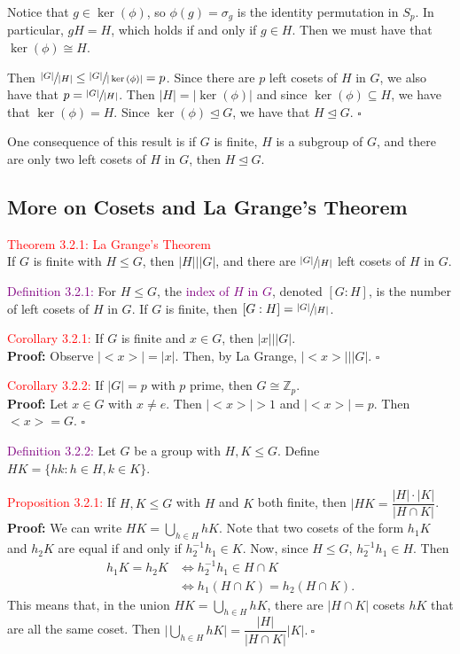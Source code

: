 \documentclass{article}
\begin{document}
Notice that $g \in \ker{(\phi)}$, so $\phi(g)=\sigma_g$ is the identity permutation in $S_p$. In particular, $gH=H$, which holds if and 
only if $g \in H$. Then we must have that $\ker(\phi) \cong H$.

Then $\sfrac{|G|}{|H|} \leq \sfrac{|G|}{|\ker{(\phi)}|} = p$. Since there are $p$ left cosets of $H$ in $G$, we also have that 
$p = \sfrac{|G|}{|H|}$. Then $|H| = |\ker{(\phi)}|$ and since $\ker{(\phi)} \subseteq H$, we have that $\ker{(\phi)}=H$. Since 
$\ker{(\phi)} \trianglelefteq G$, we have that $H \trianglelefteq G$. $\square$

One consequence of this result is if $G$ is finite, $H$ is a subgroup of $G$, and there are only two left cosets of $H$ in $G$, then 
$H \trianglelefteq G$.


\subsection{More on Cosets and La Grange's Theorem}

\textcolor{red}{Theorem 3.2.1: La Grange's Theorem}\\
If $G$ is finite with $H \leq G$, then $|H| \big| |G|$, and there are $\sfrac{|G|}{|H|}$ left cosets of $H$ in $G$.

\textcolor{purple}{Definition 3.2.1:} For $H \leq G$, the \textcolor{purple}{index of $H$ in $G$}, denoted $[G:H]$, is the number of left 
cosets of $H$ in $G$. If $G$ is finite, then $[G:H] = \sfrac{|G|}{|H|}$.

\textcolor{red}{Corollary 3.2.1:} If $G$ is finite and $x \in G$, then $|x| \big| |G|$.\\
\textbf{Proof:} Observe $|<x>| = |x|$. Then, by La Grange, $|<x>| \big| |G|$. $\square$

\textcolor{red}{Corollary 3.2.2:} If $|G| = p$ with $p$ prime, then $G \cong \mathbb{Z}_p$.\\
\textbf{Proof:} Let $x \in G$ with $x \neq e$. Then $|<x>|>1$ and $|<x>|=p$. Then $<x>=G$. $\square$

\textcolor{purple}{Definition 3.2.2:} Let $G$ be a group with $H,K \leq G$. Define $HK = \{hk: h \in H, k \in K\}$.

\textcolor{red}{Proposition 3.2.1:} If $H,K \leq G$ with $H$ and $K$ both finite, then $|HK = \dfrac{|H| \cdot |K|}{|H \cap K|}$.\\
\textbf{Proof:} We can write $HK = \bigcup_{h \in H}{hK}$. Note that two cosets of the form $h_1K$ and $h_2K$ are equal if and only if 
$h_2^{-1}h_1 \in K$. Now, since $H \leq G$, $h_2^{-1}h_1 \in H$. Then
\begin{align*}
    h_1K = h_2K &\Longleftrightarrow h_2^{-1}h_1 \in H \cap K \\
    &\Longleftrightarrow h_1(H \cap K) = h_2(H \cap K).
\end{align*}
This means that, in the union $HK = \bigcup_{h \in H}{hK}$, there are $|H \cap K|$ cosets $hK$ that are all the same coset. Then 
$\bigg| \bigcup_{h \in H}{hK} \bigg| = \dfrac{|H|}{|H \cap K|}|K|. \ \square$
\end{document}

